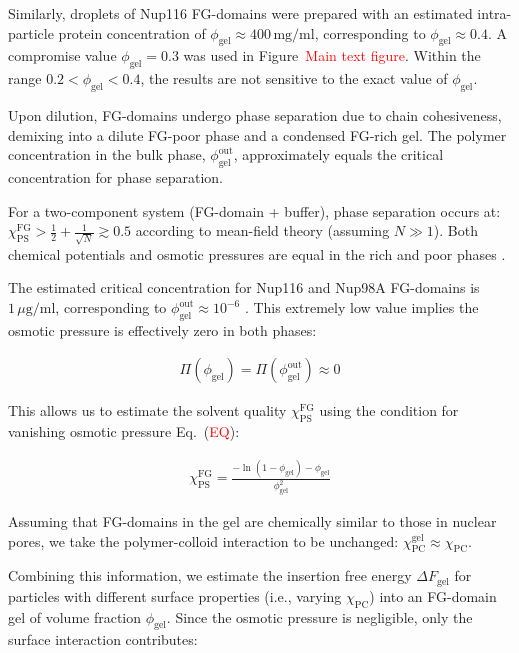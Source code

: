 \documentclass[10pt, a4paper]{article}
\newcommand\todo[1]{\textcolor{red}{#1}}
\begin{document}
\begin{multicols}{2}
Similarly, droplets of Nup116 FG-domains were prepared with an estimated intra-particle protein concentration of $\phi_{\text{gel}} \approx 400 \, \text{mg}/\text{ml}$, corresponding to $\phi_{\text{gel}} \approx 0.4$. A compromise value $\phi_{\text{gel}} = 0.3$ was used in Figure~\todo{Main text figure}.
Within the range $0.2 < \phi_{\text{gel}} < 0.4$, the results are not sensitive to the exact value of $\phi_{\text{gel}}$.

Upon dilution, FG-domains undergo phase separation due to chain cohesiveness, demixing into a dilute FG-poor phase and a condensed FG-rich gel.
The polymer concentration in the bulk phase, $\phi_{\text{gel}}^{\text{out}}$, approximately equals the critical concentration for phase separation.

For a two-component system (FG-domain + buffer), phase separation occurs at:
$
\chi_{\text{PS}}^{\text{FG}} > \frac{1}{2} + \frac{1}{\sqrt{N}} \gtrsim 0.5
$
according to mean-field theory (assuming $N \gg 1$). 
Both chemical potentials and osmotic pressures are equal in the rich and poor phases \cite{Vovk2016, Zilman2018}.

The estimated critical concentration for Nup116 and Nup98A FG-domains is $1 \, \mu\text{g}/\text{ml}$, corresponding to \mbox{$\phi_{\text{gel}}^{\text{out}} \approx 10^{-6}$} \cite{Schmidt2015}.
This extremely low value implies the osmotic pressure is effectively zero in both phases:

\begin{eqnarray}
    \Pi(\phi_{\text{gel}}) = \Pi(\phi_{\text{gel}}^{\text{out}}) \approx 0
\end{eqnarray}

This allows us to estimate the solvent quality $\chi_{\text{PS}}^{\text{FG}}$ using the condition for vanishing osmotic pressure Eq.~(\todo{EQ}):

\begin{eqnarray}
    \chi_{\text{PS}}^{\text{FG}} = \frac{-\ln(1-\phi_{\text{gel}}) - \phi_{\text{gel}}}{\phi_{\text{gel}}^2}
\end{eqnarray}

Assuming that FG-domains in the gel are chemically similar to those in nuclear pores, we take the polymer-colloid interaction to be unchanged: $\chi_{\text{PC}}^{\text{gel}} \approx \chi_{\text{PC}}$.

Combining this information, we estimate the insertion free energy $\Delta F_{\text{gel}}$ for particles with different surface properties (i.e., varying $\chi_{\text{PC}}$) into an FG-domain gel of volume fraction $\phi_{\text{gel}}$.
Since the osmotic pressure is negligible, only the surface interaction contributes:


\end{multicols}
\end{document}
